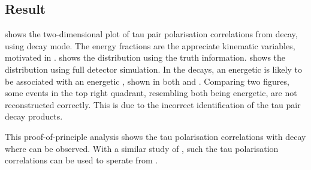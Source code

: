 \subsection{Result}

 shows the two-dimensional plot of tau pair polarisation correlations from \PZ decay, using \tauToPion decay mode. The energy fractions are the appreciate kinematic variables, motivated in .  shows the distribution using the truth information.  shows the distribution using full detector simulation. In the \ZToTauTau decays, an energetic \Ppipm is likely to be associated with an energetic \Ppipm, shown in both  and . Comparing two figures, some events in the top right quadrant, resembling both \Ppipm being energetic, are not reconstructed correctly. This is due to the incorrect identification of the tau pair decay products. 

This proof-of-principle analysis shows the tau polarisation correlations with \ZToTauTau decay where \tauToPion can be observed. With a similar study of \HiggsToTauTau, such  the tau polarisation correlations can be used to sperate \PHiggs from \PZ. 


